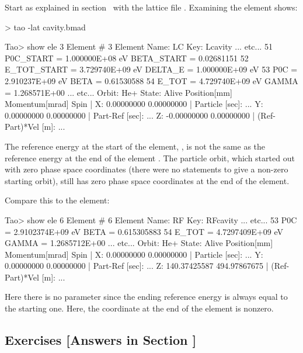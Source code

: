 \documentclass{hitec}     %
\begin{document}
Start \tao as explained in section~ with the lattice file
. Examining the  element shows:
\begin{code}
> tao -lat cavity.bmad

Tao> show ele 3
Element #                3
Element Name: LC
Key: Lcavity
... etc...
   51   P0C_START    =  1.000000E+08 eV        BETA_START   =  0.02681151
   52   E_TOT_START  =  3.729740E+09 eV        DELTA_E      =  1.000000E+09 eV
   53   P0C          =  2.910237E+09 eV        BETA         =  0.61530588
   54   E_TOT        =  4.729740E+09 eV        GAMMA        =  1.268571E+00
... etc...    
Orbit:  He+   State: Alive
         Position[mm] Momentum[mrad]        Spin   |
  X:       0.00000000     0.00000000               | Particle [sec]:     ...
  Y:       0.00000000     0.00000000               | Part-Ref [sec]:     ...
  Z:      -0.00000000     0.00000000               | (Ref-Part)*Vel [m]: ...
\end{code}

The reference energy at the start of the element, , is not the same as the reference
energy at the end of the element . The particle orbit, which started out with zero phase
space coordinates (there were no  statements to give a non-zero starting orbit), still
has zero phase space coordinates at the end of the  element.


Compare this to the  element:
\begin{code}
Tao> show ele 6
Element #                6
Element Name: RF
Key: RFcavity
... etc...
   53   P0C         =  2.9102374E+09 eV         BETA      =  0.615305883
   54   E_TOT       =  4.7297409E+09 eV         GAMMA     =  1.2685712E+00
... etc...
 Orbit:  He+   State: Alive
         Position[mm] Momentum[mrad]        Spin   |
  X:       0.00000000     0.00000000               | Particle [sec]:     ...
  Y:       0.00000000     0.00000000               | Part-Ref [sec]:     ...
  Z:     140.37425587   494.97867675               | (Ref-Part)*Vel [m]: ...
\end{code}

Here there is no  parameter since the ending reference energy is always equal to the
starting one. Here, the  coordinate at the end of the element is nonzero.

\subsection{Exercises [Answers in Section ]}
\label{s:phase.space.ex}
\end{document}
